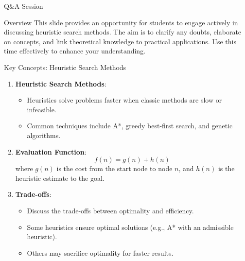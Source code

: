 \documentclass[aspectratio=169]{beamer}
\begin{document}
\begin{frame}[fragile]{Q\&A Session}
    \begin{block}{Overview}
        This slide provides an opportunity for students to engage actively in discussing heuristic search methods. The aim is to clarify any doubts, elaborate on concepts, and link theoretical knowledge to practical applications. Use this time effectively to enhance your understanding.
    \end{block}
\end{frame}

\begin{frame}[fragile]{Key Concepts: Heuristic Search Methods}
    \begin{enumerate}
        \item \textbf{Heuristic Search Methods}:
            \begin{itemize}
                \item Heuristics solve problems faster when classic methods are slow or infeasible.
                \item Common techniques include A*, greedy best-first search, and genetic algorithms.
            \end{itemize}
        
        \item \textbf{Evaluation Function}:
            \begin{equation}
                f(n) = g(n) + h(n)
            \end{equation}
            where \( g(n) \) is the cost from the start node to node \( n \), and \( h(n) \) is the heuristic estimate to the goal.
        
        \item \textbf{Trade-offs}:
            \begin{itemize}
                \item Discuss the trade-offs between optimality and efficiency.
                \item Some heuristics ensure optimal solutions (e.g., A* with an admissible heuristic).
                \item Others may sacrifice optimality for faster results.
            \end{itemize}
    \end{enumerate}
\end{frame}
\end{document}
